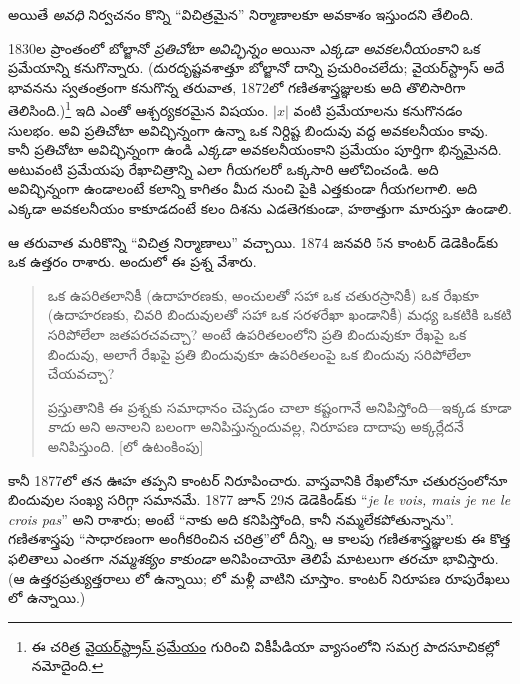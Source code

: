 \documentclass[../../../include/open-logic-section]{subfiles}
\begin{document}

అయితే \emph{అవధి} నిర్వచనం కొన్ని ``విచిత్రమైన'' నిర్మాణాలకూ అవకాశం ఇస్తుందని తేలింది.

1830ల ప్రాంతంలో బోల్జానో \emph{ప్రతిచోటా అవిచ్ఛిన్నం} అయినా \emph{ఎక్కడా అవకలనీయంకాని} ఒక ప్రమేయాన్ని కనుగొన్నారు. (దురదృష్టవశాత్తూ బోల్జానో దాన్ని ప్రచురించలేదు; వైయర్‌స్ట్రాస్ అదే భావనను స్వతంత్రంగా కనుగొన్న తరువాత, 1872లో గణితశాస్త్రజ్ఞులకు అది తొలిసారిగా తెలిసింది.)\footnote{ఈ చరిత్ర \href{http://en.wikipedia.org/wiki/Weierstrass_function}{వైయర్‌స్ట్రాస్ ప్రమేయం} గురించి వికీపీడియా వ్యాసంలోని సమగ్ర పాదసూచికల్లో నమోదైంది.} ఇది ఎంతో ఆశ్చర్యకరమైన విషయం. $|x|$ వంటి ప్రమేయాలను కనుగొనడం సులభం. అవి ప్రతిచోటా అవిచ్ఛిన్నంగా ఉన్నా ఒక నిర్దిష్ట బిందువు వద్ద అవకలనీయం కావు. కానీ ప్రతిచోటా అవిచ్ఛిన్నంగా ఉండి \emph{ఎక్కడా} అవకలనీయంకాని ప్రమేయం పూర్తిగా భిన్నమైనది. అటువంటి ప్రమేయపు రేఖాచిత్రాన్ని ఎలా గీయగలరో ఒక్కసారి ఆలోచించండి. అది అవిచ్ఛిన్నంగా ఉండాలంటే కలాన్ని కాగితం మీద నుంచి పైకి ఎత్తకుండా గీయగలగాలి. అది ఎక్కడా అవకలనీయం కాకూడదంటే కలం దిశను ఎడతెగకుండా, హఠాత్తుగా మారుస్తూ ఉండాలి.

ఆ తరువాత మరికొన్ని ``విచిత్ర నిర్మాణాలు'' వచ్చాయి. 1874 జనవరి 5న కాంటర్ డెడెకిండ్‌కు ఒక ఉత్తరం రాశారు. అందులో ఈ ప్రశ్న వేశారు.
\begin{quote}
ఒక ఉపరితలానికీ (ఉదాహరణకు, అంచులతో సహా ఒక చతురస్రానికీ) ఒక రేఖకూ (ఉదాహరణకు, చివరి బిందువులతో సహా ఒక సరళరేఖా ఖండానికీ) మధ్య ఒకటికి ఒకటి సరిపోలేలా జతపరచవచ్చా? అంటే ఉపరితలంలోని ప్రతి బిందువుకూ రేఖపై ఒక బిందువు, అలాగే రేఖపై ప్రతి బిందువుకూ ఉపరితలంపై ఒక బిందువు సరిపోలేలా చేయవచ్చా?

ప్రస్తుతానికి ఈ ప్రశ్నకు సమాధానం చెప్పడం చాలా కష్టంగానే అనిపిస్తోంది---ఇక్కడ కూడా \emph{కాదు} అని అనాలని బలంగా అనిపిస్తున్నందువల్ల, నిరూపణ దాదాపు అక్కర్లేదనే అనిపిస్తుంది. [\citealt{Gouvea2011}లో ఉటంకింపు]
\end{quote}
కానీ 1877లో తన ఊహ తప్పని కాంటర్ నిరూపించారు. వాస్తవానికి రేఖలోనూ చతురస్రంలోనూ బిందువుల సంఖ్య సరిగ్గా సమానమే. 1877 జూన్ 29న డెడెకిండ్‌కు ``\emph{je le vois, mais je ne le crois pas}'' అని రాశారు; అంటే ``నాకు అది కనిపిస్తోంది, కానీ నమ్మలేకపోతున్నాను''. గణితశాస్త్రపు ``సాధారణంగా అంగీకరించిన చరిత్ర''లో దీన్ని, ఆ కాలపు గణితశాస్త్రజ్ఞులకు ఈ కొత్త ఫలితాలు ఎంతగా \emph{నమ్మశక్యం కాకుండా} అనిపించాయో తెలిపే మాటలుగా తరచూ భావిస్తారు. (ఆ ఉత్తరప్రత్యుత్తరాలు \citet{Gouvea2011}లో ఉన్నాయి; లో మళ్లీ వాటిని చూస్తాం. కాంటర్ నిరూపణ రూపురేఖలు లో ఉన్నాయి.)
\end{document}
